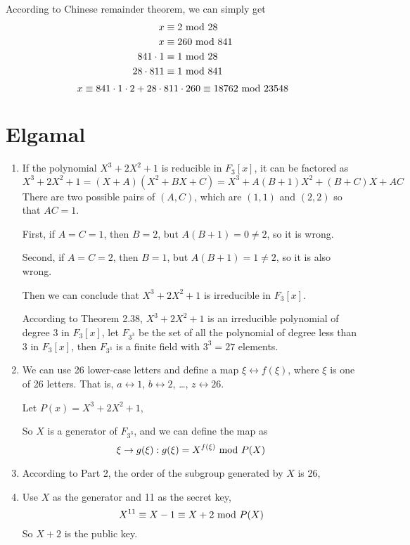\documentclass{article}
\renewcommand{\mod}{{\rm\ mod\ }}
\begin{document}
According to Chinese remainder theorem, we can simply get 
\begin{align*}
x &\equiv 2 \mod 28 \\
x &\equiv 260 \mod 841 \\
841 \cdot 1 &\equiv 1 \mod 28 \\
28 \cdot 811 &\equiv 1 \mod 841 
\end{align*}
$$x\equiv 841 \cdot 1 \cdot 2 + 28 \cdot 811 \cdot 260 \equiv 18762 \mod 23548 $$


\section{Elgamal}
\begin{enumerate}
\item
If the polynomial $X^3+2X^2+1$ is reducible in $F_3[x]$, it can be factored as $$X^3+2X^2+1=(X+A)(X^2+BX+C)=X^3+A(B+1)X^2+(B+C)X+AC$$
There are two possible pairs of $(A,C)$, which are $(1,1)$ and $(2,2)$ so that $AC=1$.

First, if $A=C=1$, then $B=2$, but $A(B+1)=0\neq 2$, so it is wrong.

Second, if $A=C=2$, then $B=1$, but $A(B+1)=1\neq2$, so it is also wrong.

Then we can conclude that $X^3+2X^2+1$ is irreducible in $F_3[x]$.

According to Theorem 2.38, $X^3+2X^2+1$ is an irreducible polynomial of degree 3 in $F_3[x]$, let $F_{3^3}$ be the set of all the polynomial of degree less than 3 in $F_3[x]$, then $F_{3^3}$ is a finite field with $3^3=27$ elements.

\item

We can use 26 lower-case letters and define a map $\xi \leftrightarrow f(\xi)$, where $\xi$ is one of 26 letters. That is, $a \leftrightarrow 1$, $b \leftrightarrow 2$, \dots, $z \leftrightarrow 26$.

Let $P(x)=X^3+2X^2+1$,


So $X$ is a generator of $F_{3^3}$, and we can define the map as $$\xi \to g(\xi): g(\xi)=X^{f(\xi)} \mod P(X)$$ 

\item

According to Part 2, the order of the subgroup generated by $X$ is 26, 

\item
Use $X$ as the generator and 11 as the secret key,
$$X^{11}\equiv X-1 \equiv X+2 \mod P(X)$$
So $X+2$ is the public key.


\end{enumerate}
\end{document}
